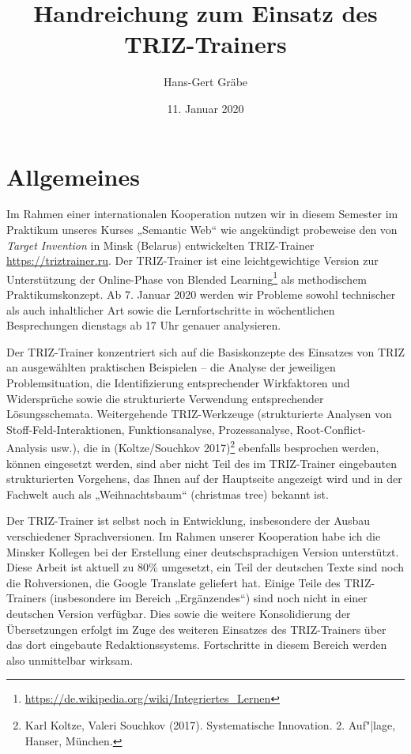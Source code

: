 \documentclass[11pt,a4paper]{article}
\title{Handreichung zum Einsatz des TRIZ-Trainers}
\author{Hans-Gert Gr\"abe}
\date{11. Januar 2020}
\begin{document}
\maketitle

\section{Allgemeines}

Im Rahmen einer internationalen Kooperation nutzen wir in diesem Semester im
Praktikum unseres Kurses „Semantic Web“ wie angekündigt probeweise den von
\emph{Target Invention} in Minsk (Belarus) entwickelten TRIZ-Trainer
\url{https://triztrainer.ru}.  Der TRIZ-Trainer ist eine leichtgewichtige
Version zur Unterstützung der Online-Phase von Blended
Learning\footnote{\url{https://de.wikipedia.org/wiki/Integriertes_Lernen}} als
methodischem Praktikumskonzept.  Ab 7. Januar 2020 werden wir Probleme sowohl
technischer als auch inhaltlicher Art sowie die Lernfortschritte in
wöchentlichen Besprechungen dienstags ab 17 Uhr genauer analysieren.

Der TRIZ-Trainer konzentriert sich auf die Basiskonzepte des Einsatzes von
TRIZ an ausgewählten praktischen Beispielen -- die Analyse der jeweiligen
Problemsituation, die Identifizierung entsprechender Wirkfaktoren und
Widersprüche sowie die strukturierte Verwendung entsprechender
Lösungsschemata.  Weitergehende TRIZ-Werkzeuge (strukturierte Analysen von
Stoff-Feld-Interaktionen, Funktionsanalyse, Prozessanalyse,
Root-Conflict-Analysis usw.), die in (Koltze/Souchkov 2017)\footnote{Karl
  Koltze, Valeri Souchkov (2017). Systematische Innovation.  2. Auf"|lage,
  Hanser, München.} ebenfalls besprochen werden, können eingesetzt werden,
sind aber nicht Teil des im TRIZ-Trainer eingebauten strukturierten Vorgehens,
das Ihnen auf der Hauptseite angezeigt wird und in der Fachwelt auch als
„Weihnachtsbaum“ (christmas tree) bekannt ist.

Der TRIZ-Trainer ist selbst noch in Entwicklung, insbesondere der Ausbau
verschiedener Sprachversionen.  Im Rahmen unserer Kooperation habe ich die
Minsker Kollegen bei der Erstellung einer deutschsprachigen Version
unterstützt.  Diese Arbeit ist aktuell zu 80\% umgesetzt, ein Teil der
deutschen Texte sind noch die Rohversionen, die Google Translate geliefert
hat.  Einige Teile des TRIZ-Trainers (insbesondere im Bereich „Ergänzendes“)
sind noch nicht in einer deutschen Version verfügbar. Dies sowie die weitere
Konsolidierung der Übersetzungen erfolgt im Zuge des weiteren Einsatzes des
TRIZ-Trainers über das dort eingebaute Redaktionssystems. Fortschritte in
diesem Bereich werden also unmittelbar wirksam.
\newpage
\end{document}
